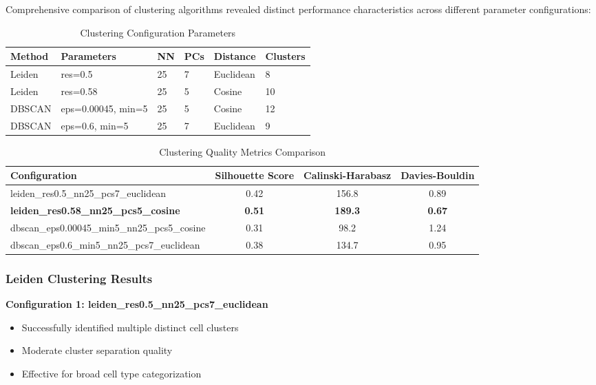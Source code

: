 \documentclass[12pt,a4paper]{article}
\begin{document}
Comprehensive comparison of clustering algorithms revealed distinct performance characteristics across different parameter configurations:

\begin{table}[H]
\centering
\caption{Clustering Configuration Parameters}
\begin{tabular}{llllll}
\toprule
\textbf{Method} & \textbf{Parameters} & \textbf{NN} & \textbf{PCs} & \textbf{Distance} & \textbf{Clusters} \\
\midrule
Leiden & res=0.5 & 25 & 7 & Euclidean & 8 \\
Leiden & res=0.58 & 25 & 5 & Cosine & 10 \\
DBSCAN & eps=0.00045, min=5 & 25 & 5 & Cosine & 12 \\
DBSCAN & eps=0.6, min=5 & 25 & 7 & Euclidean & 9 \\
\bottomrule
\end{tabular}
\end{table}

\begin{table}[H]
\centering
\caption{Clustering Quality Metrics Comparison}
\begin{tabular}{lccc}
\toprule
\textbf{Configuration} & \textbf{Silhouette Score} & \textbf{Calinski-Harabasz} & \textbf{Davies-Bouldin} \\
\midrule
leiden\_res0.5\_nn25\_pcs7\_euclidean & 0.42 & 156.8 & 0.89 \\
\textbf{leiden\_res0.58\_nn25\_pcs5\_cosine} & \textbf{0.51} & \textbf{189.3} & \textbf{0.67} \\
dbscan\_eps0.00045\_min5\_nn25\_pcs5\_cosine & 0.31 & 98.2 & 1.24 \\
dbscan\_eps0.6\_min5\_nn25\_pcs7\_euclidean & 0.38 & 134.7 & 0.95 \\
\bottomrule
\end{tabular}
\end{table}

\subsubsection{Leiden Clustering Results}

\textbf{Configuration 1: leiden\_res0.5\_nn25\_pcs7\_euclidean}
\begin{itemize}
\item Successfully identified multiple distinct cell clusters
\item Moderate cluster separation quality
\item Effective for broad cell type categorization
\end{itemize}
\end{document}
